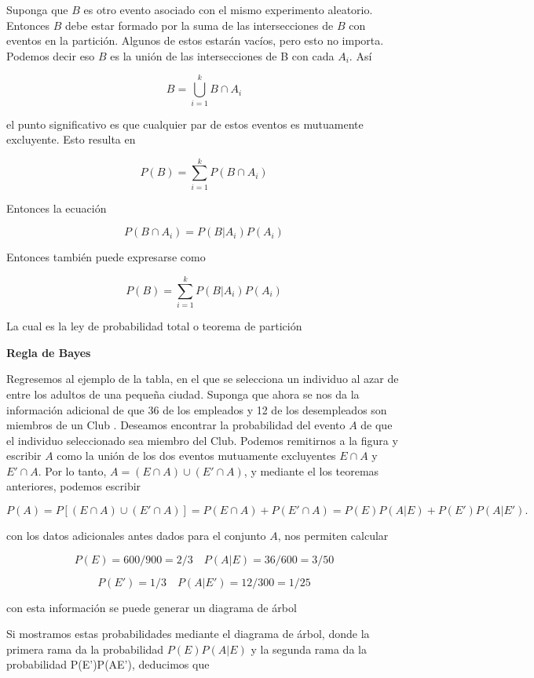 \documentclass[11pt]{article}
\begin{document}
Suponga que \(B\) es otro evento asociado con el mismo experimento
aleatorio. Entonces \(B\) debe estar formado por la suma de las
intersecciones de \(B\) con eventos en la partición. Algunos de estos
estarán vacíos, pero esto no importa. Podemos decir eso \(B\) es la
unión de las intersecciones de B con cada \(A_{i}\). Así

\[
B=\bigcup\limits_{i=1}^{k}B \cap A_{i}
\]

el punto significativo es que cualquier par de estos eventos es
mutuamente excluyente. Esto resulta en

\[
P(B)=\displaystyle \sum\limits_{i=1}^{k}P(B \cap A_{i})
\]

Entonces la ecuación

\[
P(B\cap A_{i})= P(B\vert A_{i}) P(A_{i})
\]

Entonces también puede expresarse como

\[
P(B)=\displaystyle \sum\limits_{i=1}^{k}P(B\vert A_{i}) P(A_{i})
\]

La cual es la ley de probabilidad total o teorema de partición

\textbf{Regla de Bayes}

Regresemos al ejemplo de la tabla, en el que se selecciona un individuo
al azar de entre los adultos de una pequeña ciudad. Suponga que ahora se
nos da la información adicional de que 36 de los empleados y 12 de los
desempleados son miembros de un Club . Deseamos encontrar la
probabilidad del evento \(A\) de que el individuo seleccionado sea
miembro del Club. Podemos remitirnos a la figura y escribir \(A\) como
la unión de los dos eventos mutuamente excluyentes \(E \cap A\) y
\(E' \cap A\). Por lo tanto, \(A = (E \cap A) \cup (E' \cap A)\), y
mediante el los teoremas anteriores, podemos escribir

\[
P(A) = P [(E \cap A) \cup (E' \cap A)] = P(E \cap A) + P(E' \cap A) = P(E)P(A\vert E) + P(E')P(A\vert E').
\]

con los datos adicionales antes dados para el conjunto \(A\), nos
permiten calcular

\[
P (E) = 600/900= 2/3 \quad P (A \vert E ) =36/600= 3/50
\]

\[
P (E') = 1/3 \quad P (A \vert E' ) =12/300= 1/25
\]

con esta información se puede generar un diagrama de árbol

Si mostramos estas probabilidades mediante el diagrama de árbol, donde
la primera rama da la probabilidad \(P(E)P(A\vert E)\) y la segunda rama
da la probabilidad P(E')P(A\textbar E'), deducimos que
\end{document}

